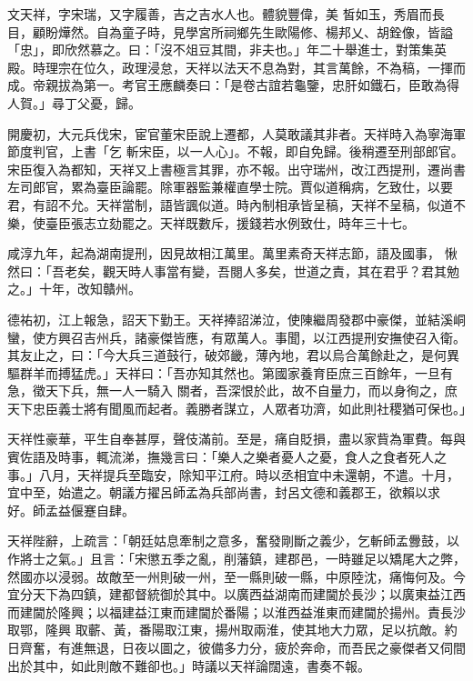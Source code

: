 \begin{pinyinscope}
 文天祥，字宋瑞，又字履善，吉之吉水人也。體貌豐偉，美
 皙如玉，秀眉而長目，顧盼燁然。自為童子時，見學宮所祠鄉先生歐陽修、楊邦乂、胡銓像，皆謚「忠」，即欣然慕之。曰：「沒不俎豆其間，非夫也。」年二十舉進士，對策集英殿。時理宗在位久，政理浸怠，天祥以法天不息為對，其言萬餘，不為稿，一揮而成。帝親拔為第一。考官王應麟奏曰：「是卷古誼若龜鑒，忠肝如鐵石，臣敢為得人賀。」尋丁父憂，歸。



 開慶初，大元兵伐宋，宦官董宋臣說上遷都，人莫敢議其非者。天祥時入為寧海軍節度判官，上書「乞
 斬宋臣，以一人心」。不報，即自免歸。後稍遷至刑部郎官。宋臣復入為都知，天祥又上書極言其罪，亦不報。出守瑞州，改江西提刑，遷尚書左司郎官，累為臺臣論罷。除軍器監兼權直學士院。賈似道稱病，乞致仕，以要君，有詔不允。天祥當制，語皆諷似道。時內制相承皆呈稿，天祥不呈稿，似道不樂，使臺臣張志立劾罷之。天祥既數斥，援錢若水例致仕，時年三十七。



 咸淳九年，起為湖南提刑，因見故相江萬里。萬里素奇天祥志節，語及國事，
 愀然曰：「吾老矣，觀天時人事當有變，吾閱人多矣，世道之責，其在君乎？君其勉之。」十年，改知贛州。



 德祐初，江上報急，詔天下勤王。天祥捧詔涕泣，使陳繼周發郡中豪傑，並結溪峒蠻，使方興召吉州兵，諸豪傑皆應，有眾萬人。事聞，以江西提刑安撫使召入衛。其友止之，曰：「今大兵三道鼓行，破郊畿，薄內地，君以烏合萬餘赴之，是何異驅群羊而搏猛虎。」天祥曰：「吾亦知其然也。第國家養育臣庶三百餘年，一旦有急，徵天下兵，無一人一騎入
 關者，吾深恨於此，故不自量力，而以身徇之，庶天下忠臣義士將有聞風而起者。義勝者謀立，人眾者功濟，如此則社稷猶可保也。」



 天祥性豪華，平生自奉甚厚，聲伎滿前。至是，痛自貶損，盡以家貲為軍費。每與賓佐語及時事，輒流涕，撫幾言曰：「樂人之樂者憂人之憂，食人之食者死人之事。」八月，天祥提兵至臨安，除知平江府。時以丞相宜中未還朝，不遣。十月，宜中至，始遣之。朝議方擢呂師孟為兵部尚書，封呂文德和義郡王，欲賴以求
 好。師孟益偃蹇自肆。



 天祥陛辭，上疏言：「朝廷姑息牽制之意多，奮發剛斷之義少，乞斬師孟釁鼓，以作將士之氣。」且言：「宋懲五季之亂，削藩鎮，建郡邑，一時雖足以矯尾大之弊，然國亦以浸弱。故敵至一州則破一州，至一縣則破一縣，中原陸沈，痛悔何及。今宜分天下為四鎮，建都督統御於其中。以廣西益湖南而建閫於長沙；以廣東益江西而建閫於隆興；以福建益江東而建閫於番陽；以淮西益淮東而建閫於揚州。責長沙取鄂，隆興
 取蘄、黃，番陽取江東，揚州取兩淮，使其地大力眾，足以抗敵。約日齊奮，有進無退，日夜以圖之，彼備多力分，疲於奔命，而吾民之豪傑者又伺間出於其中，如此則敵不難卻也。」時議以天祥論闊遠，書奏不報。




\end{pinyinscope}
